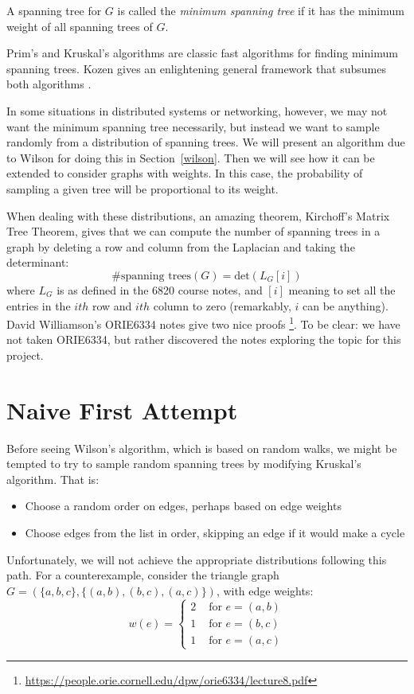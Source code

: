 \documentclass[11pt]{article}
\begin{document}
\begin{defn}
A spanning tree for $G$ is called the \emph{minimum spanning tree} if it has the
minimum weight of all spanning trees of $G$.
\end{defn}

Prim's and Kruskal's algorithms are classic fast algorithms for finding minimum
spanning trees. Kozen gives an enlightening general framework that subsumes both
algorithms \cite{kozen}.

In some situations in distributed systems or networking, however, we may not
want the minimum spanning tree necessarily, but instead we want to sample
randomly from a distribution of spanning trees. We will present an algorithm due
to Wilson \cite{wilson} for doing this in Section~\ref{wilson}. Then we will see
how it can be extended to consider graphs with weights. In this case, the
probability of sampling a given tree will be proportional to its weight.

When dealing with these distributions, an amazing theorem, Kirchoff's Matrix
Tree Theorem, gives that we can compute the number of spanning trees in a graph
by deleting a row and column from the Laplacian and taking the determinant:
\[ \#\text{spanning trees}(G) = \text{det}(L_G[i])\]
where $L_G$ is as defined in the 6820 course notes, and $[i]$ meaning to set all
the entries in the $ith$ row and $ith$ column to zero (remarkably, $i$ can be
anything). David Williamson's ORIE6334 notes give two nice proofs
\footnote{\url{https://people.orie.cornell.edu/dpw/orie6334/lecture8.pdf}}. To be clear: we have not
taken ORIE6334, but rather discovered the notes exploring the topic for this
project.

\section{Naive First Attempt}\label{naive-attempt}

Before seeing Wilson's algorithm, which is based on random walks, we might be
tempted to try to sample random spanning trees by modifying Kruskal's algorithm.
That is:
\begin{itemize}
\item Choose a random order on edges, perhaps based on edge weights
\item Choose edges from the list in order, skipping an edge if it would make a
cycle
\end{itemize}

Unfortunately, we will not achieve the appropriate distributions following this
path. For a counterexample, consider the triangle graph $G = (\{a,b,c\},
\{(a,b),(b,c),(a,c)\})$, with edge weights:
\[w(e) = \begin{cases}
        2 & \text{ for } e = (a,b)\\
        1 & \text{ for } e = (b,c)\\
        1 & \text{ for } e = (a,c)
        \end{cases}\]
\end{document}
